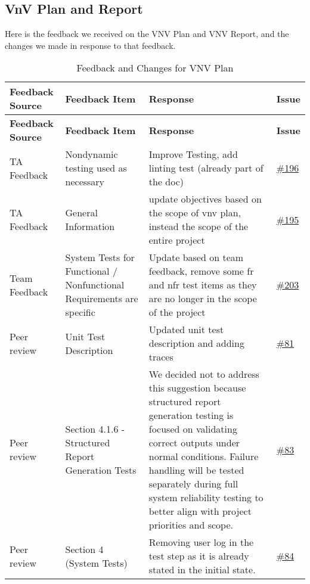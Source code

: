 \documentclass{article}
\begin{document}
\subsection{VnV Plan and Report}

Here is the feedback we received on the VNV Plan and VNV  Report, and the changes we made in response to that feedback.

\begin{longtable}{| p{} | p{} | p{} | p{} |}
    \caption{Feedback and Changes for VNV Plan} \\
    \hline
    \textbf{Feedback Source} & \textbf{Feedback Item} & \textbf{Response} & \textbf{Issue} \\
    \hline
    \endfirsthead
    \hline
    \textbf{Feedback Source} & \textbf{Feedback Item} & \textbf{Response} & \textbf{Issue} \\
    \hline
    \endhead
    \hline
    \endfoot
    TA Feedback & Nondynamic testing used as necessary & Improve Testing, add linting test (already part of the doc)& \href{https://github.com/RezaJodeiri/CXR-Capstone/issues/196}{\#196} \\
    \hline
    TA Feedback & General Information & update objectives based on the scope of vnv plan, instead the scope of the entire project & \href{https://github.com/RezaJodeiri/CXR-Capstone/issues/195}{\#195} \\
    \hline
    Team Feedback & System Tests for Functional / Nonfunctional Requirements are specific & Update based on team feedback, remove some fr and nfr test items as they are no longer in the scope of the project & \href{https://github.com/RezaJodeiri/CXR-Capstone/issues/203}{\#203}\\
    \hline
    Peer review &  Unit Test Description & Updated unit test description and adding traces & \href{https://github.com/RezaJodeiri/CXR-Capstone/issues/81}{\#81} \\
    \hline
    Peer review & Section 4.1.6 - Structured Report Generation Tests & We decided not to address this suggestion because structured report generation testing is focused on validating correct outputs under normal conditions. Failure handling will be tested separately during full system reliability testing to better align with project priorities and scope. & \href{https://github.com/RezaJodeiri/CXR-Capstone/issues/83}{\#83} \\
    \hline
    Peer review & Section 4 (System Tests) & Removing user log in the test step as it is already stated in the initial state. & \href{https://github.com/RezaJodeiri/CXR-Capstone/issues/84}{\#84} \\

\end{longtable}
\end{document}
